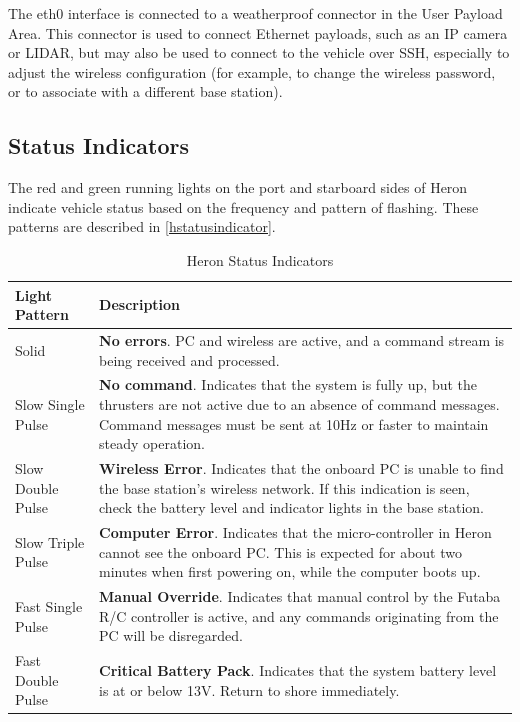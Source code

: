 \documentclass[]{clearpath-latex/clearpath-manual}
\begin{document}
The eth0 interface is connected to a weatherproof connector in the User Payload Area. This connector is used to connect Ethernet payloads, such as an IP camera or LIDAR, but may also be used to connect to the vehicle over SSH, especially to adjust the wireless configuration (for example, to change the wireless password, or to associate with a different base station).
\newpage
\subsection{Status Indicators} \label{statusindicators}
The red and green running lights on the port and starboard sides of Heron indicate vehicle status based on the frequency and pattern of flashing. These patterns are described in \autoref{hstatusindicator}.

\bgroup
\def\arraystretch{1.5}%
\begin{table}[h]
\centering
\begin{tabular}{m{} p{}}
\rowcolor{lightgrey}
Light Pattern     & Description                                                                                                                                                                                              \\ \hline
Solid             & \textbf{No errors}. PC and wireless are active, and a command stream is being received and processed.                                                                                                             \\ \hline
Slow Single Pulse & \textbf{No command}. Indicates that the system is fully up, but the thrusters are not active due to an absence of command messages. Command messages must be sent at 10Hz or faster to maintain steady operation. \\ \hline
Slow Double Pulse & \textbf{Wireless Error}. Indicates that the onboard PC is unable to find the base station’s wireless network. If this indication is seen, check the battery level and indicator lights in the base station.       \\ \hline
Slow Triple Pulse & \textbf{Computer Error}. Indicates that the micro-controller in Heron cannot see the onboard PC. This is expected for about two minutes when first powering on, while the computer boots up.                  \\ \hline
Fast Single Pulse & \textbf{Manual Override}. Indicates that manual control by the Futaba R/C controller is active, and any commands originating from the PC will be disregarded.                                                     \\ \hline
Fast Double Pulse & \textbf{Critical Battery Pack}. Indicates that the system battery level is at or below 13V. Return to shore immediately. \\ \hline
\end{tabular}
\newline
\caption{Heron Status Indicators}
\label{hstatusindicator}
\end{table}
\egroup
\end{document}
